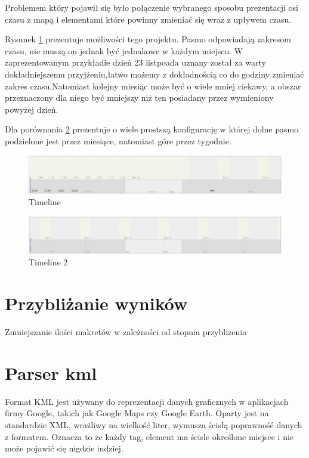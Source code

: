 Problemem który pojawił się było połączenie wybranego sposobu prezentacji osi czasu z mapą i elementami które powinny zmieniać się wraz z upływem czasu.

Rysunek \ref{fig:tm1} prezentuje możliwości tego projektu. Pasmo odpowiadają zakresom czasu, nie muszą on jednak być jednakowe w każdym miejscu. W zaprezentowanym przykładie dzień 23 listpoada uznany został za warty dokładniejszemu przyjżeniu,łatwo możemy z dokładnością co do godziny zmieniać zakres czasu.Natomiast kolejny miesiąc może być o wiele mniej ciekawy, a obszar przeznaczony dla niego być mniejszy niż ten posiadany przez wymieniony powyżej dzień.

Dla porównania \ref{fig:tm2} prezentuje o wiele prostszą konfigurację w której dolne pasmo podzielone jest przez miesiące, natomiast góre przez tygodnie.

  \begin{figure}[H]
  \centering
    \includegraphics[width=150mm]{ge/tm1.jpg}
  \caption{Timeline}
  \label{fig:tm1}
\end{figure}

  \begin{figure}[H]
  \centering
    \includegraphics[width=150mm]{ge/tm2.jpg}
  \caption{Timeline 2}
  \label{fig:tm2}
\end{figure}
\section{Przybliżanie wyników}
\label{sec:przyblizanie}

Zmniejszanie ilości makretów w zależności od stopnia przyblizenia


\section{Parser kml}
\label{sec:scaner}



Format KML jest używany do reprezentacji danych graficznych w aplikacjach firmy Google, takich jak Google Maps czy Google Earth. Oparty jest na standardzie XML, wrażliwy na wielkość liter, wymusza ścisłą poprawność danych z formatem. Oznacza to że każdy tag, element ma ścisle określone miejsce i nie może pojawić się nigdzie indziej.


